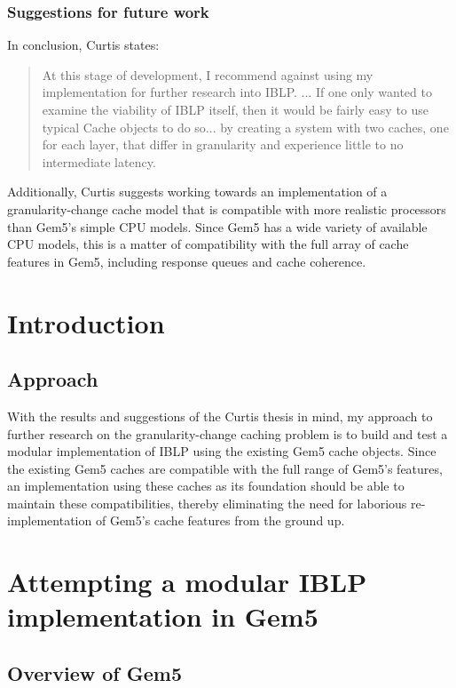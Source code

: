 \documentclass[12pt,twoside]{reedthesis}
\begin{document}
	\subsection*{Suggestions for future work}

	In conclusion, Curtis states: \begin{quote}
		At this stage of development, I recommend against using my implementation for further research into IBLP. ... If one only wanted to examine the viability of IBLP itself, then it would be fairly easy to use typical Cache objects to do so... by creating a system with two caches, one for each layer, that differ in granularity and experience little to no intermediate latency. \cite{curtis}
	\end{quote}

	Additionally, Curtis suggests working towards an implementation of a granularity-change cache model that is compatible with more realistic processors than Gem5's simple CPU models. Since Gem5 has a wide variety of available CPU models, this is a matter of compatibility with the full array of cache features in Gem5, including response queues and cache coherence.


\chapter{Introduction}

\section{Approach}

With the results and suggestions of the Curtis thesis in mind, my approach to further research on the granularity-change caching problem is to build and test a modular implementation of IBLP using the existing Gem5 cache objects. Since the existing Gem5 caches are compatible with the full range of Gem5's features, an implementation using these caches as its foundation should be able to maintain these compatibilities, thereby eliminating the need for laborious re-implementation of Gem5's cache features from the ground up.


\chapter{Attempting a modular IBLP implementation in Gem5}

\section{Overview of Gem5}
\end{document}
